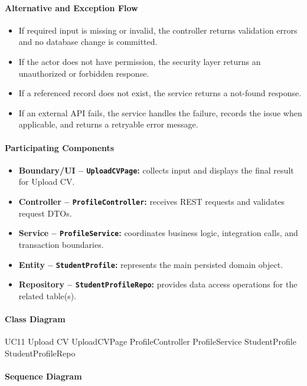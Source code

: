 \paragraph{Alternative and Exception Flow}

\begin{itemize}
    \item If required input is missing or invalid, the controller returns validation errors and no database change is committed.
    \item If the actor does not have permission, the security layer returns an unauthorized or forbidden response.
    \item If a referenced record does not exist, the service returns a not-found response.
    \item If an external API fails, the service handles the failure, records the issue when applicable, and returns a retryable error message.
\end{itemize}

\paragraph{Participating Components}

\begin{itemize}
    \item \textbf{Boundary/UI -- \texttt{UploadCVPage}:} collects input and displays the final result for Upload CV.
    \item \textbf{Controller -- \texttt{ProfileController}:} receives REST requests and validates request DTOs.
    \item \textbf{Service -- \texttt{ProfileService}:} coordinates business logic, integration calls, and transaction boundaries.
    \item \textbf{Entity -- \texttt{StudentProfile}:} represents the main persisted domain object.
    \item \textbf{Repository -- \texttt{StudentProfileRepo}:} provides data access operations for the related table(s).
\end{itemize}

\paragraph{Class Diagram}

\ClassDiagram
{UC11 Upload CV}
{UploadCVPage}
{ProfileController}
{ProfileService}
{StudentProfile}
{StudentProfileRepo}

\paragraph{Sequence Diagram}

